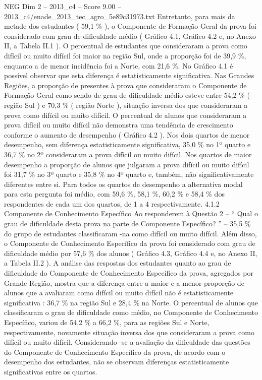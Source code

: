 \begin{textsample}{NEG Dim 2 – 2013\_c4 – Score 9.00 – 2013\_c4/enade\_2013\_tec\_agro\_5e89c31973.txt}
Entretanto, para mais da metade dos estudantes ( 59,1 \% ), o Componente de Formação Geral da prova foi considerado com grau de dificuldade médio ( Gráfico 4.1, Gráfico 4.2 e, no Anexo II, a Tabela II.1 ).
O percentual de estudantes que consideraram a prova como difícil ou muito difícil foi maior na região Sul, onde a proporção foi de 39,9 \%, enquanto a de menor incidência foi a Norte, com 21,6 \%.
No Gráfico 4.1 é possível observar que esta diferença é estatisticamente significativa.
Nas Grandes Regiões, a proporção de presentes à prova que consideraram o Componente de Formação Geral como sendo de grau de dificuldade médio esteve entre 54,2 \% ( região Sul ) e 70,3 \% ( região Norte ), situação inversa dos que consideraram a prova como difícil ou muito difícil.
O percentual de alunos que consideraram a prova difícil ou muito difícil não demonstra uma tendência de crescimento conforme o aumento de desempenho ( Gráfico 4.2 ).
Nos dois quartos de menor desempenho, sem diferença estatisticamente significativa, 35,0 \% no 1º quarto e 36,7 \% no 2º consideraram a prova difícil ou muito difícil.
Nos quartos de maior desempenho a proporção de alunos que julgaram a prova difícil ou muito difícil foi 31,7 \% no 3º quarto e 35,8 \% no 4º quarto e, também, não significativamente diferentes entre si.
Para todos os quartos de desempenho a alternativa modal para esta pergunta foi médio, com 59,6 \%, 58,1 \%, 60,2 \% e 58,4 \% dos respondentes de cada um dos quartos, de 1 a 4 respectivamente. 4.1.2 Componente de Conhecimento Específico Ao responderem à Questão 2 – “ Qual o grau de dificuldade desta prova na parte de Componente Específico? ” – 35,5 \% do grupo de estudantes classificaram -na como difícil ou muito difícil.
Além disso, o Componente de Conhecimento Específico da prova foi considerado com grau de dificuldade médio por 57,6 \% dos alunos ( Gráfico 4.3, Gráfico 4.4 e, no Anexo II, a Tabela II.2 ).
A análise das respostas dos estudantes quanto ao grau de dificuldade do Componente de Conhecimento Específico da prova, agregados por Grande Região, mostra que a diferença entre a maior e a menor proporção de alunos que a avaliaram como difícil ou muito difícil não é estatisticamente significativa : 36,7 \% na região Sul e 28,4 \% na Norte.
O percentual de alunos que classificaram o grau de dificuldade como médio, no Componente de Conhecimento Específico, variou de 54,2 \% a 66,2 \%, para as regiões Sul e Norte, respectivamente, novamente situação inversa dos que consideraram a prova como difícil ou muito difícil.
Considerando -se a avaliação da dificuldade das questões do Componente de Conhecimento Específico da prova, de acordo com o desempenho dos estudantes, não se observam diferenças estatisticamente significativas entre os quartos.

\end{textsample}
